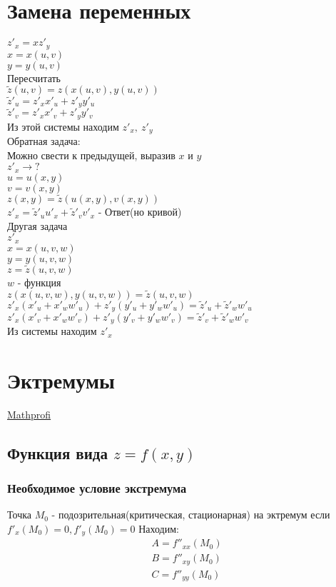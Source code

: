 \documentclass{article}
\begin{document}
\section{Замена переменных}
\label{sec:orgf4414ba}
\(z'_x = xz'_y\) \\
\(x = x(u ,v)\) \\
\(y = y(u ,v)\) \\
Пересчитать \\
\(\tilde{z}(u, v) = z(x(u ,v), y(u, v))\) \\
\(\tilde{z}'_u = z'_x x'_u + z'_y y'_u\) \\
\(\tilde{z}'_v = z'_x x'_v + z'_y y'_v\) \\
Из этой системы находим \(z'_x,\ z'_y\) \\
Обратная задача: \\
Можно свести к предыдущей, выразив \(x\) и \(y\) \\
\(z'_x \rightarrow ?\) \\
\(u = u(x, y)\) \\
\(v = v(x, y)\) \\
\(z(x, y) = \tilde{z}(u(x, y), v(x, y))\) \\
\(z'_x = \tilde{z}'_u u'_x + \tilde{z}'_v v'_x\) - Ответ(но кривой) \\
Другая задача \\
\(z'_x\) \\
\(x = x(u, v, w)\) \\
\(y = y(u, v, w)\) \\
\(z = \tilde{z}(u, v, w)\) \\
\(w\) - функция \\
\(z(x(u, v, w), y(u, v, w)) = \tilde{z}(u, v, w)\) \\
\(z'_x(x'_u + x'_w w'_u) + z'_y(y'_u + y'_w w'_u) = \tilde{z}'_u + \tilde{z}'_w w'_u\) \\
\(z'_x(x'_v + x'_w w'_v) + z'_y(y'_v + y'_w w'_v) = \tilde{z}'_v + \tilde{z}'_w w'_v\) \\
Из системы находим \(z'_x\)
\section{Эктремумы}
\label{sec:orgee2dcf3}
\href{http://mathprofi.ru/extremumy\_funkcij\_dvuh\_i\_treh\_peremennyh.html}{Mathprofi}
\subsection{Функция вида \(z = f(x, y)\)}
\label{sec:org3dd096c}
\subsubsection{Необходимое условие экстремума}
\label{sec:org1212596}
Точка \(M_0\) - подозрительная(критическая, стационарная) на эктремум
если \(f'_x(M_0) = 0, f'_y(M_0) = 0\)
Находим: 
\begin{gather*}
A = f''_{xx}(M_0) \\
B = f''_{xy}(M_0) \\
C = f''_{yy}(M_0) \\
\end{gather*}
\end{document}
